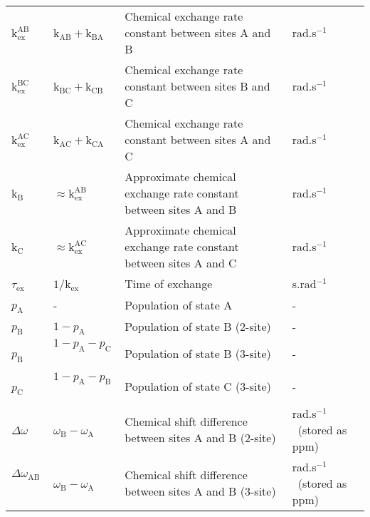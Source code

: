 \documentclass[a4paper,11pt,twoside,openright]{book}
\begin{document}
{\begin{landscape}
\begin{center}
\begin{small}
\begin{longtable}{llll}
$\textrm{k}_\textrm{ex}^\textrm{AB}$\            & $\textrm{k}_\textrm{AB}+ \textrm{k}_\textrm{BA}$\                   & Chemical exchange rate constant between sites A and B                         & rad.s$^{-1}$\  \\
$\textrm{k}_\textrm{ex}^\textrm{BC}$\            & $\textrm{k}_\textrm{BC}+ \textrm{k}_\textrm{CB}$\                   & Chemical exchange rate constant between sites B and C                         & rad.s$^{-1}$\  \\
$\textrm{k}_\textrm{ex}^\textrm{AC}$\            & $\textrm{k}_\textrm{AC}+ \textrm{k}_\textrm{CA}$\                   & Chemical exchange rate constant between sites A and C                         & rad.s$^{-1}$\  \\
$\textrm{k}_\textrm{B}$\               & $\approx \textrm{k}_\textrm{ex}^\textrm{AB}$\                & Approximate chemical exchange rate constant between sites A and B             & rad.s$^{-1}$\  \\
$\textrm{k}_\textrm{C}$\               & $\approx \textrm{k}_\textrm{ex}^\textrm{AC}$\                & Approximate chemical exchange rate constant between sites A and C             & rad.s$^{-1}$\  \\
$\tau_\textrm{ex}$\              & $1 / \textrm{k}_\textrm{ex}$\                      & Time of exchange                                                              & s.rad$^{-1}$\  \\
$p_\textrm{A}$\               & -                              & Population of state A                                                         & - \\
$p_\textrm{B}$\               & $1-p_\textrm{A}$\                         & Population of state B (2-site)                                                & - \\
$p_\textrm{B}$\               & $1-p_\textrm{A}-p_\textrm{C}$\                     & Population of state B (3-site)                                                & - \\
$p_\textrm{C}$\               & $1-p_\textrm{A}-p_\textrm{B}$\                     & Population of state C (3-site)                                                & - \\
$\Delta\omega $\               & $\omega_\textrm{B}-\omega_\textrm{A}$\               & Chemical shift difference between sites A and B (2-site)                      & rad.s$^{-1}$\  (stored as ppm) \\
$\Delta\omega_\textrm{AB}$\             & $\omega_\textrm{B}-\omega_\textrm{A}$\               & Chemical shift difference between sites A and B (3-site)                      & rad.s$^{-1}$\  (stored as ppm) \\

\end{longtable}
\end{small}
\end{center}
\end{landscape}}
\end{document}
